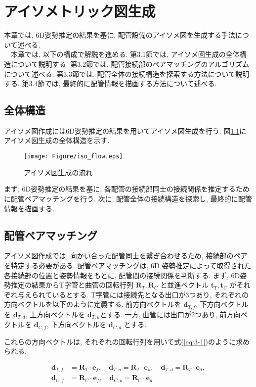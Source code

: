 \chapter{アイソメトリック図生成}
本章では, 6D姿勢推定の結果を基に, 配管設備のアイソメ図を生成する手法について述べる. \\
　本章では, 以下の構成で解説を進める. 
第3.1節では, アイソメ図生成の全体構造について説明する. 
第3.2節では, 配管接続部のペアマッチングのアルゴリズムについて述べる. 
第3.3節では, 配管全体の接続構造を探索する方法について説明する. 
第3.4節では, 最終的に配管情報を描画する方法について述べる. 

\section{全体構造}
アイソメ図作成には6D姿勢推定の結果を用いてアイソメ図生成を行う. 
図\ref{fig:3-f1}にアイソメ図生成の全体構造を示す. 
\begin{figure}[htbt]
  \centering
   \texttt{[image: Figure/iso\_flow.eps]}
   \caption{アイソメ図生成の流れ}
   \label{fig:3-f1}
\end{figure}

まず, 6D姿勢推定の結果を基に, 各配管の接続部同士の接続関係を推定するために配管ペアマッチングを行う. 
次に, 配管全体の接続構造を探索し, 最終的に配管情報を描画する. 

\section{配管ペアマッチング}
アイソメ図作成では, 向かい合った配管同士を繋ぎ合わせるため, 接続部のペアを特定する必要がある. 
配管ペアマッチングは, 6D 姿勢推定によって取得された各接続部の位置と姿勢情報をもとに, 配管間の接続関係を判断する. 
まず, 6D姿勢推定の結果からT字管と曲管の回転行列 $\mathbf{R}_T, \mathbf{R}_C$ と並進ベクトル $\mathbf{t}_T, \mathbf{t}_C$ がそれぞれ与えられているとする. 
T字管には接続先となる出口が3つあり, それぞれの方向ベクトルを以下のように定義する. 
前方向ベクトルを $\mathbf{d}_{T,f}$, 下方向ベクトルを $\mathbf{d}_{T,d}$, 上方向ベクトルを $\mathbf{d}_{T,u}$とする. 
一方, 曲管には出口が2つあり, 前方向ベクトルを $\mathbf{d}_{C,f}$, 下方向ベクトルを $\mathbf{d}_{C,d}$ とする. 

これらの方向ベクトルは, それぞれの回転行列を用いて式(\ref{eq:3-1})のように求められる. 

\begin{equation}
  \begin{aligned}
  \mathbf{d}_{T,f} &= \mathbf{R}_T \cdot \mathbf{e}_f, \quad 
  \mathbf{d}_{T,u} = \mathbf{R}_T \cdot \mathbf{e}_u, \quad 
  \mathbf{d}_{T,d} = \mathbf{R}_T \cdot \mathbf{e}_d, \\
  \mathbf{d}_{C,f} &= \mathbf{R}_C \cdot \mathbf{e}_f, \quad 
  \mathbf{d}_{C,u} = \mathbf{R}_C \cdot \mathbf{e}_u
  \end{aligned}
  \label{eq:3-1}
\end{equation}

